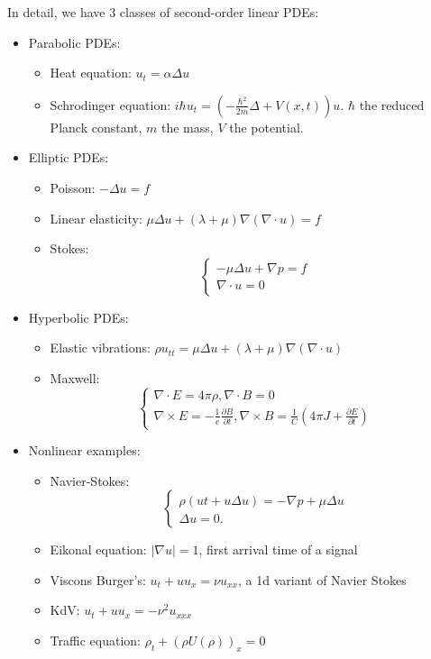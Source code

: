 In detail, we have 3 classes of second-order linear PDEs: 
\begin{itemize}
    \item Parabolic PDEs: 
    \begin{itemize}
        \item Heat equation: $ u_t = \alpha  \Delta  u $ 
        \item Schrodinger equation: $ i\hbar u_t = (-\frac{\hbar ^2}{2m}\Delta + V(x,t))u $. $\hbar$ the reduced Planck constant, $m$ the mass, $V$ the potential. 
    \end{itemize}
    \item Elliptic PDEs: 
    \begin{itemize}
        \item Poisson: $ -\Delta u =f $ 
        \item Linear elasticity: $ \mu \Delta u + (\lambda +\mu ) \nabla (\nabla \cdot u) = f $ 
        \item Stokes: \[
        \begin{cases}
            -\mu \Delta u + \nabla p = f \\ 
            \nabla \cdot u = 0
        \end{cases} 
        \] 
    \end{itemize}
    \item Hyperbolic PDEs: 
    \begin{itemize}
        \item Elastic vibrations: $ \rho u_{tt} = \mu \Delta u + (\lambda + \mu ) \nabla(\nabla\cdot u) $ 
        \item Maxwell: 
        \[
            \begin{cases}
                \nabla \cdot E = 4\pi \rho,  \nabla \cdot B = 0 \\ 
                \nabla \times E = -\frac{1}{c}\frac{\partial B}{\partial t}, \nabla \times B = \frac{1}{C}\left( 4\pi J + \frac{\partial E}{\partial t} \right) 
            \end{cases}
        \]
    \end{itemize}
    \item Nonlinear examples: 
    \begin{itemize}
        \item Navier-Stokes: 
        \[
            \begin{cases}
                \rho (ut + u \Delta u) = -\nabla p + \mu \Delta u \\ 
                \Delta u = 0. 
            \end{cases}
        \]
        \item Eikonal equation: $ |\nabla u| = 1 $, first arrival time of a signal
        \item Viscons Burger's: $ u_t + uu_x = \nu u_{xx} $, a 1d variant of Navier Stokes 
        \item KdV: $ u_t + uu_x = -\nu^2 u_{xxx} $
        \item Traffic equation: $ \rho_t + (\rho U(\rho))_x = 0 $    
    \end{itemize}
\end{itemize}

